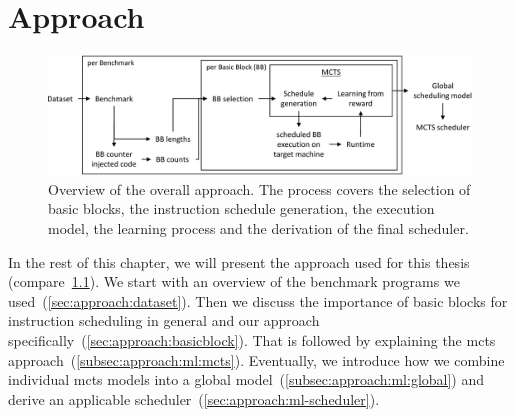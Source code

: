 \chapter{Approach}

\begin{figure}
    \centering
    \includegraphics[width=\textwidth]{img/ppt/approach_overview-crop.pdf}
    \caption[Overview of the approach]{Overview of the overall approach. 
    The process covers the selection of basic blocks, the instruction schedule generation, the execution model, the learning process and the derivation of the final scheduler.}
    \label{fig:approach:overview}
\end{figure}
In the rest of this chapter, we will present the approach used for this thesis (compare~\cref{fig:approach:overview}).
We start with an overview of the benchmark programs we used~(\cref{sec:approach:dataset}).
Then we discuss the importance of basic blocks for instruction scheduling in general and our approach specifically~(\cref{sec:approach:basicblock}).
That is followed by explaining the \ac{mcts} approach~(\cref{subsec:approach:ml:mcts}).
Eventually, we introduce how we combine individual \ac{mcts} models into a global model~(\cref{subsec:approach:ml:global}) and derive an applicable scheduler~(\cref{sec:approach:ml-scheduler}).

